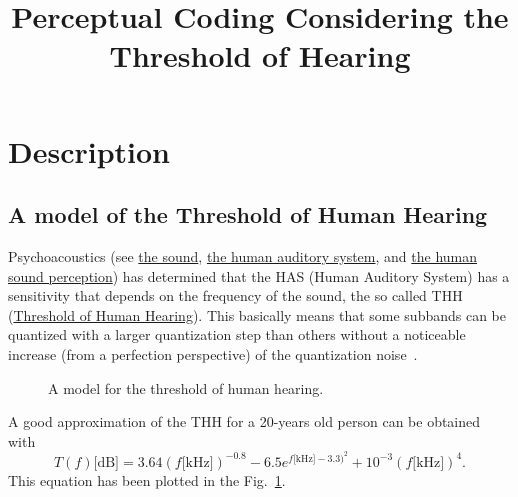 
\title{Perceptual Coding Considering the Threshold of Hearing}

\maketitle

\section{Description}

\subsection{A model of the Threshold of Human Hearing}

Psychoacoustics (see
\href{https://vicente-gonzalez-ruiz.github.io/the_sound/}{the sound},
\href{https://vicente-gonzalez-ruiz.github.io/human_auditory_system/}{the
  human auditory system}, and
\href{https://vicente-gonzalez-ruiz.github.io/human_sound_perception/}{the
  human sound perception}) has determined that the HAS (Human Auditory
System) has a sensitivity that depends on the frequency of the sound,
the so called THH
(\href{https://en.wikipedia.org/wiki/Absolute_threshold_of_hearing}{Threshold
  of Human Hearing}). This basically means that some subbands can be
quantized with a larger quantization step than others without a
noticeable increase (from a perfection perspective) of the
quantization noise~\cite{sayood2017introduction}.

\begin{figure}
  \centering
  \caption{A model for the threshold of human hearing.}
  \label{fig:ToHH}
\end{figure}

A good approximation of the THH for a 20-years old person can be
obtained with~\cite{bosi2003intro}
\begin{equation}
  T(f)\text{[dB]} = 3.64(f\text{[kHz]})^{-0.8} - 6.5e^{f\text{[kHz]}-3.3)^2} + 10^{-3}(f\text{[kHz]})^4.
  \label{eq:ToHH}
\end{equation}
This equation has been plotted in the Fig.~\ref{fig:ToHH}.


